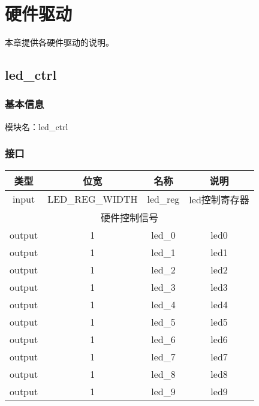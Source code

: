 %
% 
% 
% 
% 
% 
% 
%

\chapter{硬件驱动}
本章提供各硬件驱动的说明。
\section{led\_ctrl}
\subsection{基本信息}
模块名：led\_ctrl
\subsection{接口}
\begin{tabular}{|c|c|c|c|}
    \hline
    类型    &   位宽    &   名称    &   说明\\\hline
    input   &   LED\_REG\_WIDTH   &   led\_reg &   led控制寄存器\\\hline
    \multicolumn{4}{|c|}{硬件控制信号}\\\hline
    output   &   1   &   led\_0  &   led0\\\hline
    output   &   1   &   led\_1  &   led1\\\hline
    output   &   1   &   led\_2  &   led2\\\hline
    output   &   1   &   led\_3  &   led3\\\hline
    output   &   1   &   led\_4  &   led4\\\hline
    output   &   1   &   led\_5  &   led5\\\hline
    output   &   1   &   led\_6  &   led6\\\hline
    output   &   1   &   led\_7  &   led7\\\hline
    output   &   1   &   led\_8  &   led8\\\hline
    output   &   1   &   led\_9  &   led9\\\hline
\end{tabular}
